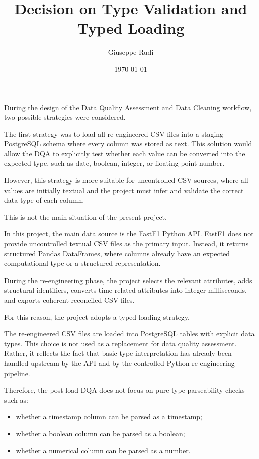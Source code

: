 \documentclass[a4paper,11pt]{article}
\title{Decision on Type Validation and Typed Loading}
\author{Giuseppe Rudi}
\date{\today}
\begin{document}
	
	\maketitle

	
	During the design of the Data Quality Assessment and Data Cleaning workflow, two possible strategies were considered.
	
	The first strategy was to load all re-engineered CSV files into a staging PostgreSQL schema where every column was stored as text.
	This solution would allow the DQA to explicitly test whether each value can be converted into the expected type, such as date, boolean, integer, or floating-point number.
	
	However, this strategy is more suitable for uncontrolled CSV sources, where all values are initially textual and the project must infer and validate the correct data type of each column.
	
	This is not the main situation of the present project.
	
	In this project, the main data source is the FastF1 Python API.
	FastF1 does not provide uncontrolled textual CSV files as the primary input.
	Instead, it returns structured Pandas DataFrames, where columns already have an expected computational type or a structured representation.
	
	During the re-engineering phase, the project selects the relevant attributes, adds structural identifiers, converts time-related attributes into integer milliseconds, and exports coherent reconciled CSV files.
	
	For this reason, the project adopts a typed loading strategy.
	
	The re-engineered CSV files are loaded into PostgreSQL tables with explicit data types.
	This choice is not used as a replacement for data quality assessment.
	Rather, it reflects the fact that basic type interpretation has already been handled upstream by the API and by the controlled Python re-engineering pipeline.
	
	Therefore, the post-load DQA does not focus on pure type parseability checks such as:
	
	\begin{itemize}
		\item whether a timestamp column can be parsed as a timestamp;
		\item whether a boolean column can be parsed as a boolean;
		\item whether a numerical column can be parsed as a number.
	\end{itemize}
	
\end{document}
